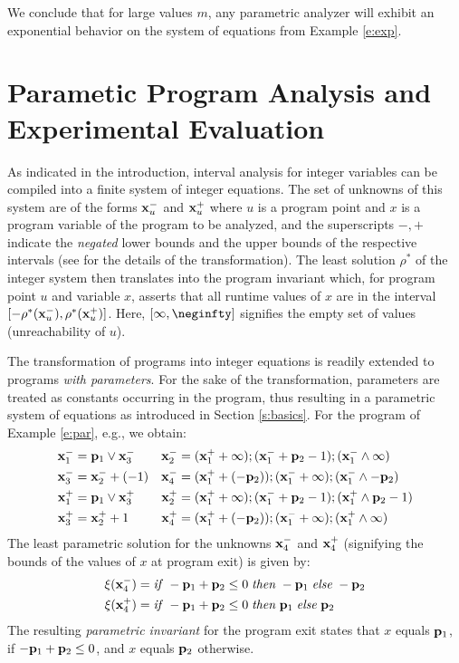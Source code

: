 \documentclass[a4paper]{easychair}
\begin{document}
\noindent
We conclude that
for large values $m$, any parametric analyzer will exhibit an exponential behavior on the 
system of equations from Example \ref{e:exp}. 


\section{Parametic Program Analysis and Experimental Evaluation}\label{s:experiments}

As indicated in the introduction,
interval analysis for integer variables can be compiled
into a finite system of integer equations. The set of unknowns
of this system are
of the forms ${\bf x}_u^-$ and $ {\bf x}_u^+$ where 
$u$ is a program point 
and 
$x$ is a program variable
of the program to be analyzed, and the superscripts $-,+$ indicate the \emph{negated} lower bounds and
the upper bounds of the respective intervals 
(see \cite{Gawlitza07PreciseFix,DBLP:conf/fm/GawlitzaS08} for the details of the transformation).
The least solution $\rho^*$ of the integer system then translates into the program
invariant which, for program point $u$ and variable $x$, asserts that all runtime values of $x$
are in the interval $[-\rho^*({\bf x}_u^-), \rho^*({\bf x}_u^+)]$.
Here, $[\infty,\neginfty]$ signifies the empty set of values (unreachability of 
$u$).

The transformation of programs into integer equations is readily extended to programs 
\emph{with parameters}. For the sake of the transformation, parameters are treated
as constants occurring in the program, thus resulting in a parametric system of equations
as introduced in Section \ref{s:basics}.
For the program of Example \ref{e:par}, e.g., we obtain:
\begin{align*}
{\bf x}_1^- &= {\bf p}_1 \vee {\bf x}_3^-        &
        {\bf x}_2^- &= ({\bf x}_1^+ +\infty);({\bf x}_1^-+{\bf p}_2 -1);({\bf x}_1^-\wedge\infty)      \\
        {\bf x}_3^- &= {\bf x}_2^- + (-1)           &
        {\bf x}_4^- &= ({\bf x}_1^+ +(-{\bf p}_2));({\bf x}_1^-+\infty);({\bf x}_1^- \wedge -{\bf p}_2)      \\
{\bf x}_1^+ &= {\bf p}_1 \vee {\bf x}_3^+        &
        {\bf x}_2^+ &= ({\bf x}_1^+ +\infty);({\bf x}_1^-+{\bf p}_2 -1);({\bf x}_1^+\wedge {\bf p}_2 -1)      \\
        {\bf x}_3^+ &= {\bf x}_2^+ +1           &
        {\bf x}_4^+ &= ({\bf x}_1^+ +(-{\bf p}_2));({\bf x}_1^-+\infty);({\bf x}_1^+ \wedge \infty)    
      \end{align*}
The least parametric solution for the unknowns ${\bf x}_4^-$ and ${\bf x}_4^+$ (signifying
the bounds of the values of $x$ at program exit) is given by:
	\begin{align*}
\xi({\bf x}_4^-) &= {\it if}\; -{\bf p}_1 + {\bf p}_2\leq 0\;{\it then}\;-{\bf p}_1\; {\it else}\;-{\bf p}_2	\\
\xi({\bf x}_4^+) &= {\it if}\; -{\bf p}_1 + {\bf p}_2\leq 0\;{\it then}\;{\bf p}_1\; {\it else}\;{\bf p}_2
	\end{align*}
The resulting \emph{parametric invariant} for the program exit 
states that $x$ equals ${\bf p}_1$, if 
$-{\bf p}_1 + {\bf p}_2\leq 0$, and $x$ equals ${\bf p}_2$ otherwise.
\end{document}
